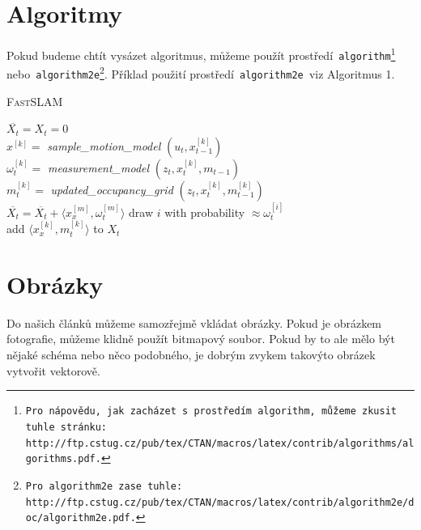 \documentclass[a4paper, 11pt]{article}
\begin{document}
\section{Algoritmy}
\label{Alg}
Pokud budeme chtít vysázet algoritmus, můžeme použít prostředí\texttt{ algorithm\footnote{Pro nápovědu, jak zacházet s~prostředím\texttt{ algorithm}, můžeme zkusit tuhle stránku:\\
http://ftp.cstug.cz/pub/tex/CTAN/macros/latex/contrib/algorithms/algorithms.pdf.} }nebo\texttt{ algorithm2e\footnote{Pro\texttt{ algorithm2e }zase tuhle: http://ftp.cstug.cz/pub/tex/CTAN/macros/latex/contrib/algorithm2e/doc/algorithm2e.pdf.}}.
Příklad použití prostředí\texttt{ algorithm2e }viz Algoritmus 1.
\bigskip
\begin{algorithm}
\caption{\textsc{FastSLAM}}
\label{fastSLAM_alg}
\SetNlSkip{-1em}
\SetInd{1em}{0em}
\SetNlSty{}{}{:}
\BlankLine
\Indp
\Indpp
$\overline{X_t} = X_t = 0$\\
{
    $x^{[k]} = $ \emph{sample\_motion\_model} $(u_t, x_{t-1}^{[k]})$\\
    $\omega_{t}^{[k]} = $ \emph{measurement\_model} $(z_{t},x_{t}^{[k]},m_{t-1})$\\
    $m_{t}^{[k]} = $ \emph{updated\_occupancy\_grid} $(z_{t},x_{t}^{[k]},m_{t-1}^{[k]})$\\
    $\overline{X_t} = \overline{X_t} + \langle x_{x}^{[m]},\omega_{t}^{[m]} \rangle$
}
{
    draw $i$ with probability $\approx \omega_{t}^{[i]}$\\
    add $\langle x_{x}^{[k]},m_{t}^{[k]}\rangle$ to $X_t$
}
\end{algorithm}

\section{Obrázky}
Do našich článků můžeme samozřejmě vkládat obrázky. Pokud je obrázkem fotografie, můžeme klidně použít
bitmapový soubor. Pokud by to ale mělo být nějaké schéma nebo něco podobného, je dobrým zvykem takovýto
obrázek vytvořit vektorově.
\end{document}
